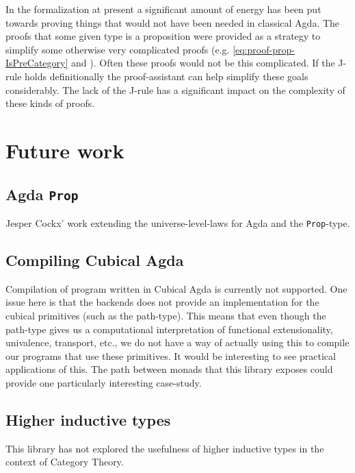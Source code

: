 In the formalization at present a significant amount of energy has
been put towards proving things that would not have been needed in
classical Agda. The proofs that some given type is a proposition were
provided as a strategy to simplify some otherwise very complicated
proofs (e.g. \ref{eq:proof-prop-IsPreCategory}
and \label{eq:productPath}). Often these proofs would not be this
complicated. If the J-rule holds definitionally the proof-assistant
can help simplify these goals considerably. The lack of the J-rule has
a significant impact on the complexity of these kinds of proofs.


\section{Future work}
\subsection{Agda \texttt{Prop}}
Jesper Cockx' work extending the universe-level-laws for Agda and the
\texttt{Prop}-type.

\subsection{Compiling Cubical Agda}
\label{sec:compiling-cubical-agda}
Compilation of program written in Cubical Agda is currently not
supported. One issue here is that the backends does not provide an
implementation for the cubical primitives (such as the path-type).
This means that even though the path-type gives us a computational
interpretation of functional extensionality, univalence, transport,
etc., we do not have a way of actually using this to compile our
programs that use these primitives. It would be interesting to see
practical applications of this. The path between monads that this
library exposes could provide one particularly interesting case-study.

\subsection{Higher inductive types}
This library has not explored the usefulness of higher inductive types
in the context of Category Theory.
